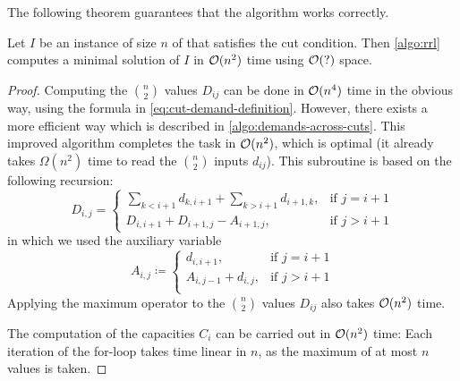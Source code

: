 The following theorem guarantees that the algorithm works correctly.
\begin{theorem}
	\label{theo:rll-algo-correct}
	Let $I$ be an instance of size $n$ of \RRL that satisfies the cut condition.
	Then \cref{algo:rrl} computes a minimal solution of $I$ in $\mathcal{O}(n^2)$ time using $\mathcal{O}(?)$ space.
\end{theorem}
\begin{proof}
	Computing the $\binom{n}{2}$ values $D_{ij}$ can be done in $\mathcal{O}(n^4)$ time in the obvious way, using the formula in \cref{eq:cut-demand-definition}.
	However, there exists a more efficient way which is described in \cref{algo:demands-across-cuts}.
	This improved algorithm completes the task in $\mathcal{O}(n^2)$, which is optimal (it already takes $\Omega(n^2)$ time to read the $\binom{n}{2}$ inputs $d_{ij}$).
	This subroutine is based on the following recursion:
	\begin{equation}
		D_{i, j} = \begin{cases}
			\sum_{k < i+1} d_{k,i+1} + \sum_{k > i+1} d_{i+1, k}, & \text{if } j = i+1 \\
			D_{i, i+1} + D_{i+1, j} - A_{i+1, j}, & \text{if } j > i+1
		\end{cases}
	\end{equation}
	in which we used the auxiliary variable
	\begin{equation}
		A_{i, j} \coloneqq \begin{cases}
				d_{i, i+1}, & \text{if } j = i+1\\
				A_{i, j-1} + d_{i, j}, &\text{if } j > i+1\\
		\end{cases}
	\end{equation}
	Applying the maximum operator to the $\binom{n}{2}$ values $D_{ij}$ also takes $\mathcal{O}(n^2)$ time.
	
	The computation of the capacities $C_i$ can be carried out in $\mathcal{O}(n^2)$ time:
	Each iteration of the for-loop takes time linear in $n$, as the maximum of at most $n$ values is taken.
	
\end{proof}


